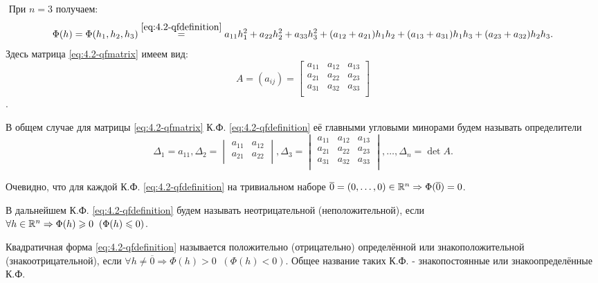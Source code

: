 \begin{example}$  $      
	При $  n = 3 $ получаем:
    \begin{equation*}
        \Phi(h) = \Phi(h_1, h_2, h_3) \overset{\eqref{eq:4.2-qfdefinition}}{=}
        a_{11}h_1^2 + a_{22}h_2^2 + a_{33}h_3^2 + (a_{12} + a_{21})h_1h_2 + (a_{13} + a_{31})h_1h_3 +
        (a_{23} + a_{32})h_2h_3.
    \end{equation*}
	Здесь матрица \eqref{eq:4.2-qfmatrix} имеем вид:
	\begin{equation*}
		A = (a_{ij}) = \begin{bmatrix}
			a_{11} & a_{12} & a_{13}\\
			a_{21} & a_{22} & a_{23}\\
			a_{31} & a_{32} & a_{33}\\
		\end{bmatrix}
	\end{equation*}.
\end{example}

В общем случае для матрицы \eqref{eq:4.2-qfmatrix} К.Ф. \eqref{eq:4.2-qfdefinition} её главными угловыми
минорами будем называть определители
\begin{equation}
	\label{eq:4.2-qfdet}
	\Delta_1 = a_{11}, \Delta_2 =
	\begin{vmatrix}
		a_{11} & a_{12}\\
		a_{21} & a_{22}\\
	\end{vmatrix},
	\Delta_3 = \begin{vmatrix}
		a_{11} & a_{12} & a_{13}\\
		a_{21} & a_{22} & a_{23}\\
		a_{31} & a_{32} & a_{33}\\
	\end{vmatrix},
	\ldots, \Delta_n = \det A.
\end{equation}

Очевидно, что для каждой К.Ф. \eqref{eq:4.2-qfdefinition} на тривиальном наборе
${\overline{0} = (0, \ldots, 0) \in \mathbb{R}^{n} \Rightarrow \Phi(\overline{0}) = 0}$.

В дальнейшем К.Ф. \eqref{eq:4.2-qfdefinition} будем называть неотрицательной (неположительной), если\\
${\forall h \in \mathbb{R}^{n} \Rightarrow \Phi(h) \geqslant 0 \;\; (\Phi(h) \leqslant 0)}$. 

Квадратичная
форма \eqref{eq:4.2-qfdefinition} называется положительно (отрицательно) определённой или
знакоположительной (знакоотрицательной), если $\forall h \neq \overline{0} \Rightarrow \Phi(h) > 0 \;\; (\Phi(h) < 0)$. Общее название таких К.Ф. - знакопостоянные или знакоопределённые К.Ф.

